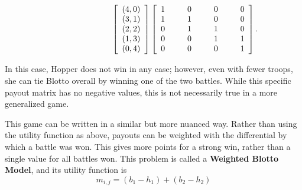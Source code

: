 \documentclass[11pt]{article}
\begin{document}
\begin{equation*}\hphantom{++++++++}
\left[ {\begin{array}{c}
(4,0) \\
(3,1) \\
(2,2) \\
(1,3) \\
(0,4) \\
\end{array} } \right]
\left[ {\begin{array}{cccc}
1\hphantom{(,0)} & 0\hphantom{(,0)} & 0\hphantom{(,0)} & 0 \\
1\hphantom{(,0)} & 1\hphantom{(,0)} & 0\hphantom{(,0)} & 0 \\
0\hphantom{(,0)} & 1\hphantom{(,0)} & 1\hphantom{(,0)} & 0 \\
0\hphantom{(,0)} & 0\hphantom{(,0)} & 1\hphantom{(,0)} & 1 \\
0\hphantom{(,0)} & 0\hphantom{(,0)} & 0\hphantom{(,0)} & 1 \\
\end{array} } \right].
\end{equation*}

In this case, Hopper does not win in any case; however, even with fewer
troops, she can tie Blotto overall by winning one of the two
battles. While this specific payout matrix has no negative values, this
is not necessarily true in a more generalized game.

This game can be written in a similar but more nuanced way. Rather than
using the utility function as above, payouts can be weighted with the
differential by which a battle was won. This gives more points for a
strong win, rather than a single value for all battles won. This problem
is called a \textbf{Weighted Blotto Model}, and its utility function is
\begin{equation*}
m_{i,j} = (b_1-h_1)+(b_2-h_2)
\end{equation*}
\end{document}
